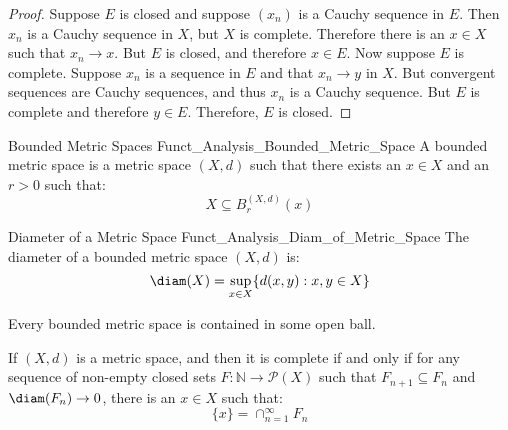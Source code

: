             \begin{proof}
                Suppose $E$ is closed and suppose $(x_{n})$ is a
                Cauchy sequence in $E$. Then $x_{n}$ is a Cauchy
                sequence in $X$, but $X$ is complete. Therefore
                there is an $x\in{X}$ such that
                $x_{n}\rightarrow{x}$. But $E$ is closed,
                and therefore $x\in{E}$. Now suppose $E$ is
                complete. Suppose $x_{n}$ is a sequence in $E$
                and that $x_{n}\rightarrow{y}$ in $X$. But
                convergent sequences are Cauchy sequences, and
                thus $x_{n}$ is a Cauchy sequence. But $E$ is
                complete and therefore $y\in{E}$.
                Therefore, $E$ is closed.
            \end{proof}
            \begin{ldefinition}{Bounded Metric Spaces}
                  {Funct_Analysis_Bounded_Metric_Space}
                A bounded metric space is a metric space
                $(X,d)$ such that there exists an $x\in{X}$
                and an $r>0$ such that:
                \begin{equation}
                    X\subseteq{B}_{r}^{(X,d)}(x)
                \end{equation}
            \end{ldefinition}
            \begin{ldefinition}{Diameter of a Metric Space}
                  {Funct_Analysis_Diam_of_Metric_Space}
                The diameter of a bounded metric space $(X,d)$ is:
                \begin{equation}
                    \diam(X)=\sup_{x\in{X}}\{d(x,y):x,y\in{X}\}
                \end{equation}
            \end{ldefinition}
            Every bounded metric space is contained in some
            open ball.
            \begin{theorem}
                If $(X,d)$ is a metric space, and then it
                is complete if and only if for any sequence
                of non-empty closed sets
                $F:\mathbb{N}\rightarrow\mathcal{P}(X)$ such that
                $F_{n+1}\subseteq{F}_{n}$ and
                $\diam(F_{n})\rightarrow{0}$,
                there is an $x\in{X}$ such that:
                \begin{equation}
                    \{x\}=\cap_{n=1}^{\infty}F_{n}
                \end{equation}
            \end{theorem}
